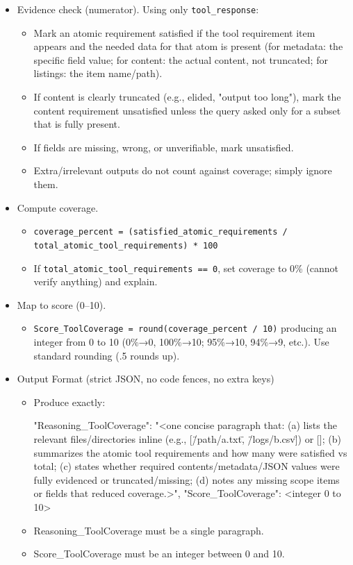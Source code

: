 \begin{ColorBlock}[Prompt]
\begin{itemize}
  \item Evidence check (numerator). Using only \texttt{tool\_response}:
    \begin{itemize}
      \item Mark an atomic requirement satisfied if the tool requirement item appears and the needed data for that atom is present (for metadata: the specific field value; for content: the actual content, not truncated; for listings: the item name/path).
      \item If content is clearly truncated (e.g., elided, "output too long"), mark the content requirement unsatisfied unless the query asked only for a subset that is fully present.
      \item If fields are missing, wrong, or unverifiable, mark unsatisfied.
      \item Extra/irrelevant outputs do not count against coverage; simply ignore them.
    \end{itemize}

  \item Compute coverage.
    \begin{itemize}
      \item \texttt{coverage\_percent = (satisfied\_atomic\_requirements / total\_atomic\_tool\_requirements) * 100}
      \item If \texttt{total\_atomic\_tool\_requirements == 0}, set coverage to 0\% (cannot verify anything) and explain.
    \end{itemize}

  \item Map to score (0--10).
    \begin{itemize}
      \item \texttt{Score\_ToolCoverage = round(coverage\_percent / 10)} producing an integer from 0 to 10 (0\%→0, 100\%→10; 95\%→10, 94\%→9, etc.). Use standard rounding (.5 rounds up).
    \end{itemize}

  \item Output Format (strict JSON, no code fences, no extra keys)
    \begin{itemize}
      \item Produce exactly:
\begin{JSONblock}
{
"Reasoning_ToolCoverage": "<one concise paragraph that: (a) lists the relevant files/directories inline (e.g., [\"/path/a.txt\", \"/logs/b.csv\"]) or []; (b) summarizes the atomic tool requirements and how many were satisfied vs total; (c) states whether required contents/metadata/JSON values were fully evidenced or truncated/missing; (d) notes any missing scope items or fields that reduced coverage.>",
"Score_ToolCoverage": <integer 0 to 10>
}
\end{JSONblock}
      \item Reasoning\_ToolCoverage must be a single paragraph.
      \item Score\_ToolCoverage must be an integer between 0 and 10.
    \end{itemize}
\end{itemize}


\end{ColorBlock}
